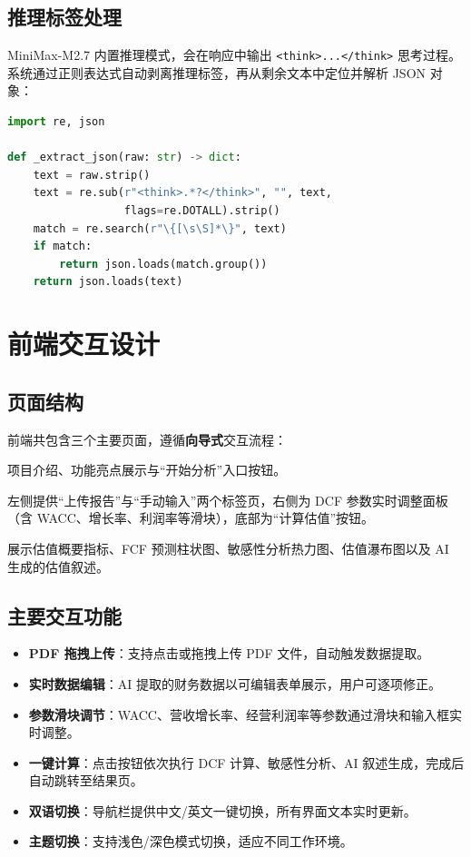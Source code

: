 \documentclass[12pt,a4paper]{article}
\begin{document}
\subsection{推理标签处理}

MiniMax-M2.7 内置推理模式，会在响应中输出 \texttt{<think>...</think>} 思考过程。系统通过正则表达式自动剥离推理标签，再从剩余文本中定位并解析 JSON 对象：

\begin{lstlisting}[language=Python,caption=推理标签处理]
import re, json

def _extract_json(raw: str) -> dict:
    text = raw.strip()
    text = re.sub(r"<think>.*?</think>", "", text,
                  flags=re.DOTALL).strip()
    match = re.search(r"\{[\s\S]*\}", text)
    if match:
        return json.loads(match.group())
    return json.loads(text)
\end{lstlisting}

\section{前端交互设计}

\subsection{页面结构}

前端共包含三个主要页面，遵循\textbf{向导式}交互流程：

\begin{description}[leftmargin=2em]
  \item[首页（HomePage）] 项目介绍、功能亮点展示与``开始分析''入口按钮。
  \item[分析页（AnalysisPage）] 左侧提供``上传报告''与``手动输入''两个标签页，右侧为 DCF 参数实时调整面板（含 WACC、增长率、利润率等滑块），底部为``计算估值''按钮。
  \item[结果页（ResultPage）] 展示估值概要指标、FCF 预测柱状图、敏感性分析热力图、估值瀑布图以及 AI 生成的估值叙述。
\end{description}

\subsection{主要交互功能}

\begin{itemize}[leftmargin=2em]
  \item \textbf{PDF 拖拽上传}：支持点击或拖拽上传 PDF 文件，自动触发数据提取。
  \item \textbf{实时数据编辑}：AI 提取的财务数据以可编辑表单展示，用户可逐项修正。
  \item \textbf{参数滑块调节}：WACC、营收增长率、经营利润率等参数通过滑块和输入框实时调整。
  \item \textbf{一键计算}：点击按钮依次执行 DCF 计算、敏感性分析、AI 叙述生成，完成后自动跳转至结果页。
  \item \textbf{双语切换}：导航栏提供中文/英文一键切换，所有界面文本实时更新。
  \item \textbf{主题切换}：支持浅色/深色模式切换，适应不同工作环境。
\end{itemize}
\end{document}
